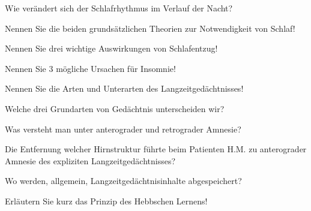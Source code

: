 \documentclass[10pt, a4paper]{exam}
\begin{document}
\begin{questions}
  \question Wie verändert sich der Schlafrhythmus im Verlauf der Nacht?
  \begin{solution}

  \end{solution}

  \question Nennen Sie die beiden grundsätzlichen Theorien zur Notwendigkeit von Schlaf!
  \begin{solution}

  \end{solution}

  \question Nennen Sie drei wichtige Auswirkungen von Schlafentzug!
  \begin{solution}

  \end{solution}

  \question Nennen Sie 3 mögliche Ursachen für Insomnie!
  \begin{solution}

  \end{solution}

  \question Nennen Sie die Arten und Unterarten des Langzeitgedächtnisses!
  \begin{solution}

  \end{solution}

  \question Welche drei Grundarten von Gedächtnis unterscheiden wir?
  \begin{solution}

  \end{solution}

  \question Was versteht man unter anterograder und retrograder Amnesie?
  \begin{solution}

  \end{solution}

  \question Die Entfernung welcher Hirnstruktur führte beim Patienten H.M. zu anterograder Amnesie des expliziten Langzeitgedächtnisses?
  \begin{solution}

  \end{solution}

  \question Wo werden, allgemein, Langzeitgedächtnisinhalte abgespeichert?
  \begin{solution}

  \end{solution}

  \question Erläutern Sie kurz das Prinzip des Hebbschen Lernens!
  \begin{solution}


\end{solution}
\end{questions}
\end{document}
